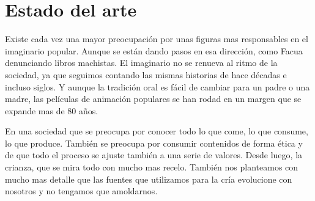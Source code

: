 \noindent %
\chapter{Estado del arte}
\noindent

Existe cada vez una mayor preocupación por unas figuras mas responsables en el imaginario popular. Aunque se están dando pasos en esa dirección, como Facua denunciando libros machistas\cite{LibroEstereotipo}. El imaginario no se renueva al ritmo de la sociedad, ya que seguimos contando las mismas historias de hace décadas e incluso siglos. Y aunque la tradición oral es fácil de cambiar para un padre o una madre, las películas de animación populares se han rodad en un margen que se expande mas de 80 años\cite{england2011gender}.

En una sociedad que se preocupa por conocer todo lo que come, lo que consume, lo que produce. También se preocupa por consumir contenidos de forma ética y de que todo el proceso se ajuste también a una serie de valores. Desde luego, la crianza, que se mira todo con mucho mas recelo\cite{linebarger2005infants}. También nos planteamos con mucho mas detalle que las fuentes que utilizamos para la cría evolucione con nosotros \cite{ross2004escape} y no tengamos que amoldarnos. 
